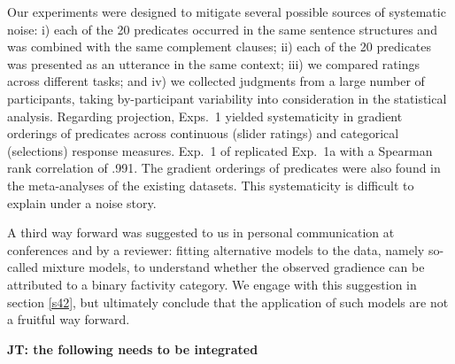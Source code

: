 \documentclass[11pt,fleqn]{article}
\newcommand{\6}{\mbox{$[\hspace*{-.6mm}[$}}
\newcommand{\9}{\mbox{$]\hspace*{-.6mm}]$}}
\newcommand{\jt}[1]{\textbf{\color{blue}JT: #1}}
\begin{document}
Our experiments were designed to mitigate several possible sources of systematic noise: i) each of the 20 predicates occurred in the same sentence structures and was combined with the same complement clauses; ii) each of the 20 predicates was presented as an utterance in the same context; iii) we compared ratings across different tasks; and iv) we collected judgments from a large number of participants, taking by-participant variability into consideration in the statistical analysis. Regarding projection, Exps.~1 yielded systematicity in gradient orderings of predicates across continuous (slider ratings) and categorical (selections) response measures. Exp.~1 of \citealt{degen-tonhauser-openmind} replicated Exp.~1a with a Spearman rank correlation of .991. The gradient orderings of predicates were also found in the meta-analyses of the existing datasets. This systematicity is difficult to explain under a noise story. 

A third way forward was suggested to us in personal communication at conferences and by a reviewer: fitting alternative models to the data, namely so-called mixture models, to understand whether the observed gradience can be attributed to a binary factivity category. We engage with this suggestion in section \ref{s42}, but ultimately conclude that the application of such models are not a fruitful way forward.

\jt{the following needs to be integrated}
\end{document}
